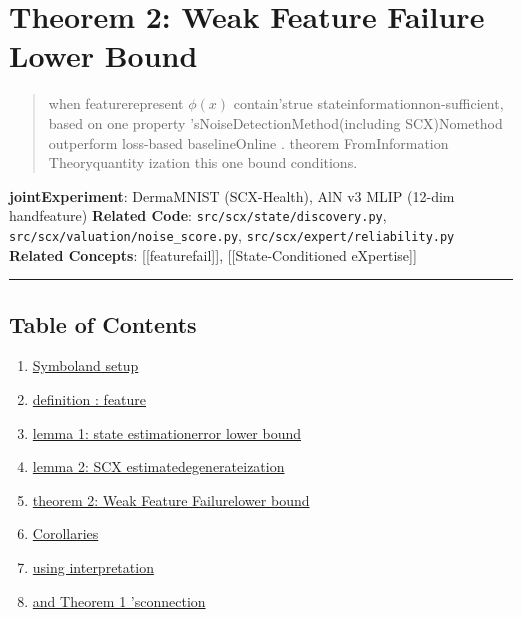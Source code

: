 \documentclass[
  12pt,
]{article}
\author{SCX}
\date{2026}
\providecommand{\tightlist}{%
  \setlength{\itemsep}{0pt}\setlength{\parskip}{0pt}}
\begin{document}
\section{Theorem 2: Weak Feature Failure Lower
Bound}\label{theorem-2-weak-feature-failure-lower-bound}

\begin{quote}
when featurerepresent \(\phi(x)\)
contain'strue stateinformationnon-sufficient, based on one property 'sNoiseDetectionMethod(including 
SCX)Nomethod outperform loss-based baselineOnline . theorem FromInformation Theoryquantity ization this one bound conditions. 
\end{quote}

\textbf{jointExperiment}: DermaMNIST (SCX-Health), AlN v3 MLIP (12-dim
handfeature) \textbf{Related Code}: \texttt{src/scx/state/discovery.py},
\texttt{src/scx/valuation/noise\_score.py},
\texttt{src/scx/expert/reliability.py} \textbf{Related Concepts}:
{[}{[}featurefail{]}{]}, {[}{[}State-Conditioned eXpertise{]}{]}

\begin{center}\rule{0.5\linewidth}{0.5pt}\end{center}

\subsection{Table of Contents}\label{ux76eeux5f55}

\begin{enumerate}
\def\labelenumi{\arabic{enumi}.}
\tightlist
\item
  \hyperref[1-ux7b26ux53f7ux4e0eux8bbeux5b9a]{Symboland setup}
\item
  \hyperref[2-ux5b9aux4e49ux5f31ux7279ux5f81]{definition : feature}
\item
  \hyperref[3-ux5f15ux7406-1ux72b6ux6001ux4f30ux8ba1ux8befux5deeux4e0bux754c]{lemma 
  1: state estimationerror lower bound}
\item
  \hyperref[4-ux5f15ux7406-2scx-ux4f30ux8ba1ux9000ux5316]{lemma  2: SCX
  estimatedegenerateization }
\item
  \hyperref[5-ux5b9aux7406-2ux5f31ux7279ux5f81ux5931ux8d25ux4e0bux754c]{theorem 
  2: Weak Feature Failurelower bound}
\item
  \hyperref[6-ux63a8ux8bba]{Corollaries}
\item
  \hyperref[7-ux5b9eux7528ux89e3ux8bfb]{using interpretation}
\item
  \hyperref[8-ux4e0e-theorem-1-ux7684ux8054ux7cfb]{and  Theorem 1 'sconnection}
\end{enumerate}
\end{document}

